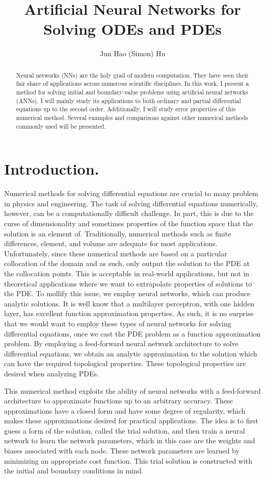 \documentclass[10pt]{article}
\title{Artificial Neural Networks for Solving ODEs and PDEs}
\author{Jun Hao (Simon) Hu}
\theoremstyle{plain}
\theoremstyle{definition}
\theoremstyle{remark}
\numberwithin{theorem}{section}
\numberwithin{proposition}{section}
\numberwithin{remark}{section}
\numberwithin{corollary}{section}
\numberwithin{definition}{section}
\numberwithin{lemma}{section}
\numberwithin{equation}{section}
\begin{document}
\maketitle 
\begin{abstract}	
	Neural networks (NNs) are the holy grail of modern computation. They have seen their fair share of applications across numerous scientific disciplines. In this work, I present a method for solving initial and boundary-value problems using artificial neural networks (ANNs). I will mainly study its applications to both ordinary and partial differential equations up to the second order. Additionally, I will study error properties of this numerical method. Several examples and comparisons against other numerical methods commonly used will be presented.
\end{abstract}
\section{Introduction.}
Numerical methods for solving differential equations are crucial to many problem in physics and engineering. The task of solving differential equations numerically, however, can be a computationally difficult challenge. In part, this is due to the curse of dimensionality and sometimes properties of the function space that the solution is an element of. Traditionally, numerical methods such as finite differences, element, and volume are adequate for most applications. Unfortunately, since these numerical methods are based on a particular collocation of the domain and as such, only output the solution to the PDE at the collocation points. This is acceptable in real-world applications, but not in theoretical applications where we want to extrapolate properties of solutions to the PDE. To mollify this issue, we employ neural networks, which can produce analytic solutions. It is well know that a multilayer perceptron, with one hidden layer, has excellent function approximation properties. As such, it is no surprise that we would want to employ these types of neural networks for solving differential equations, once we cast the PDE problem as a function approximation problem. By employing a feed-forward neural network architecture to solve differential equations, we obtain an analytic approximation to the solution which can have the required topological properties. These topological properties are desired when analyzing PDEs. 

This numerical method exploits the ability of neural networks with a feed-forward architecture to approximate functions up to an arbitrary accuracy. These approximations have a closed form and have some degree of regularity, which makes these approximations desired for practical applications. The idea is to first guess a form of the solution, called the trial solution, and then train a neural network to learn the network parameters, which in this case are the weights and biases associated with each node. These network parameters are learned by minimizing an appropriate cost function. This trial solution is constructed with the initial and boundary conditions in mind.
\end{document}
